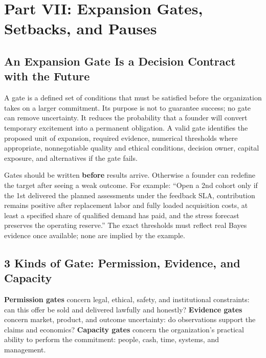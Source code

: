 \section*{Part VII: Expansion Gates, Setbacks, and Pauses}
\label{sec:part7_expansion_gates_setbacks}

\subsection{An Expansion Gate Is a Decision Contract with the Future}
\label{sec:expansion_gate_decision_contract}

A gate is a defined set of conditions that must be satisfied before the organization takes on a larger commitment. Its purpose is not to guarantee success; no gate can remove uncertainty. It reduces the probability that a founder will convert temporary excitement into a permanent obligation. A valid gate identifies the proposed unit of expansion, required evidence, numerical thresholds where appropriate, nonnegotiable quality and ethical conditions, decision owner, capital exposure, and alternatives if the gate fails.

Gates should be written \textbf{before} results arrive. Otherwise a founder can redefine the target after seeing a weak outcome. For example: ``Open a 2nd cohort only if the 1st delivered the planned assessments under the feedback SLA, contribution remains positive after replacement labor and fully loaded acquisition costs, at least a specified share of qualified demand has paid, and the stress forecast preserves the operating reserve.'' The exact thresholds must reflect real Bayes evidence once available; none are implied by the example.

\subsection{3 Kinds of Gate: Permission, Evidence, and Capacity}
\label{sec:three_kinds_of_gates}

\textbf{Permission gates} concern legal, ethical, safety, and institutional constraints: can this offer be sold and delivered lawfully and honestly? \textbf{Evidence gates} concern market, product, and outcome uncertainty: do observations support the claims and economics? \textbf{Capacity gates} concern the organization's practical ability to perform the commitment: people, cash, time, systems, and management.

